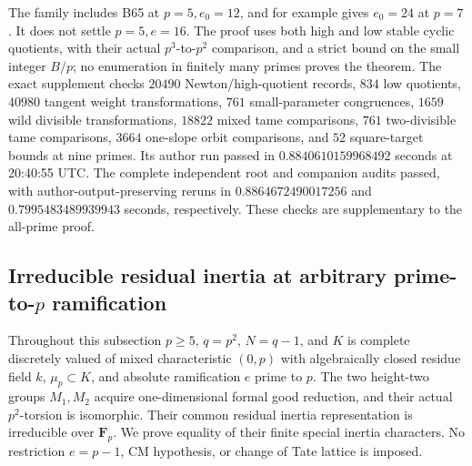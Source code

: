 \begin{remark}
\label{rem:B-RD66-scope}
The family includes B65 at $p=5,e_0=12$, and for example gives
$e_0=24$ at $p=7$. It does not settle $p=5,e=16$. The proof uses
both high and low stable cyclic quotients, with their actual
$p^3$-to-$p^2$ comparison, and a strict bound on the small integer
$B/p$; no enumeration in finitely many primes proves the theorem.
The exact supplement
checks $20490$ Newton/high-quotient records, $834$ low quotients,
$40980$ tangent weight transformations, $761$ small-parameter
congruences, $1659$ wild divisible transformations, $18822$ mixed
tame comparisons, $761$ two-divisible tame comparisons, $3664$
one-slope orbit comparisons, and $52$ square-target bounds at
nine primes. Its author run passed in $0.8840610159968492$ seconds
at 20:40:55 UTC. The complete independent root and companion audits passed, with author-output-preserving reruns in $0.8864672490017256$ and $0.7995483489939943$ seconds, respectively. These checks are supplementary to the all-prime proof.
\end{remark}


\subsection{Irreducible residual inertia at arbitrary prime-to-\(p\) ramification}

Throughout this subsection \(p\ge5\), \(q=p^2\), \(N=q-1\), and
\(K\) is complete discretely valued of mixed characteristic \((0,p)\)
with algebraically closed residue field \(k\), \(\mu_p\subset K\),
and absolute ramification \(e\) prime to \(p\). The two height-two
groups \(M_1,M_2\) acquire one-dimensional formal good reduction,
and their actual \(p^2\)-torsion is isomorphic. Their common residual
inertia representation is irreducible over \(\mathbf F_p\).
We prove equality of their finite special inertia characters.
No restriction \(e=p-1\), CM hypothesis, or change of Tate lattice
is imposed.

